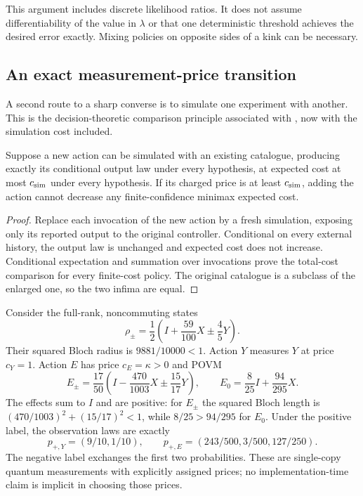 This argument includes discrete likelihood ratios. It does not assume
differentiability of the value in $\lambda$ or that one deterministic
threshold achieves the desired error exactly. Mixing policies on opposite
sides of a kink can be necessary.

\subsection{An exact measurement-price transition}
\label{sec:sharp-price}
A second route to a sharp converse is to simulate one experiment with
another. This is the decision-theoretic comparison principle associated
with \citet{blackwell1953}, now with the simulation cost included.

\begin{lemma}\label{lem:cost-simulation}
Suppose a new action can be simulated with an existing catalogue, producing
exactly its conditional output law under every hypothesis, at expected
cost at most $c_{\rm sim}$ under every hypothesis. If its charged price
is at least $c_{\rm sim}$, adding the action cannot decrease any
finite-confidence minimax expected cost.
\end{lemma}
\begin{proof}
Replace each invocation of the new action by a fresh simulation, exposing
only its reported output to the original controller. Conditional on every
external history, the output law is unchanged and expected cost does not
increase. Conditional expectation and summation over invocations prove
the total-cost comparison for every finite-cost policy. The original
catalogue is a subclass of the enlarged one, so the two infima are equal.
\end{proof}

Consider the full-rank, noncommuting states
\begin{equation}\label{eq:sharp-states}
 \rho_\pm=\frac12\left(I+\frac{59}{100}X\pm\frac45Y\right).
\end{equation}
Their squared Bloch radius is $9881/10000<1$.
Action $Y$ measures $Y$ at price $c_Y=1$.
Action $E$ has price $c_E=\kappa>0$ and POVM
\begin{equation}\label{eq:sharp-effects}
 E_\pm=\frac{17}{50}
   \left(I-\frac{470}{1003}X\pm\frac{15}{17}Y\right),
 \qquad E_0=\frac8{25}I+\frac{94}{295}X.
\end{equation}
The effects sum to $I$ and are positive: for $E_\pm$ the squared Bloch
length is $(470/1003)^2+(15/17)^2<1$, while $8/25>94/295$ for $E_0$.
Under the positive label, the observation laws are exactly
\begin{equation}\label{eq:sharp-laws}
 p_{+,Y}=(9/10,1/10),\qquad
 p_{+,E}=(243/500,3/500,127/250).
\end{equation}
The negative label exchanges the first two probabilities.
These are single-copy quantum measurements with explicitly assigned
prices; no implementation-time claim is implicit in choosing those prices.


